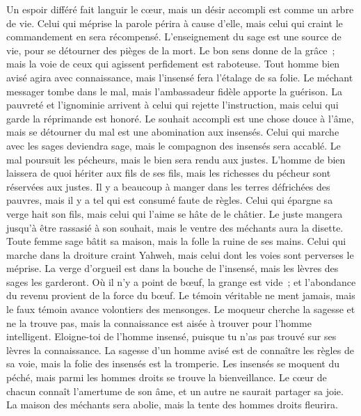 \begin{multicols}{2}
Un espoir différé fait languir le cœur, mais un désir accompli est comme un arbre de vie.
Celui qui méprise la parole périra à cause d'elle, mais celui qui craint le commandement en sera récompensé.
L'enseignement du sage est une source de vie, pour se détourner des pièges de la mort.
Le bon sens donne de la grâce~; mais la voie de ceux qui agissent perfidement est raboteuse.
Tout homme bien avisé agira avec connaissance, mais l'insensé fera l'étalage de sa folie.
Le méchant messager tombe dans le mal, mais l'ambassadeur fidèle apporte la guérison.
La pauvreté et l'ignominie arrivent à celui qui rejette l'instruction, mais celui qui garde la réprimande est honoré.
Le souhait accompli est une chose douce à l'âme, mais se détourner du mal est une abomination aux insensés.
Celui qui marche avec les sages deviendra sage, mais le compagnon des insensés sera accablé.
Le mal poursuit les pécheurs, mais le bien sera rendu aux justes.
L'homme de bien laissera de quoi hériter aux fils de ses fils, mais les richesses du pécheur sont réservées aux justes.
Il y a beaucoup à manger dans les terres défrichées des pauvres, mais il y a tel qui est consumé faute de règles.
Celui qui épargne sa verge hait son fils, mais celui qui l'aime se hâte de le châtier.
Le juste mangera jusqu'à être rassasié à son souhait, mais le ventre des méchants aura la disette.
\VerseOne{}Toute femme sage bâtit sa maison, mais la folle la ruine de ses mains.
Celui qui marche dans la droiture craint Yahweh, mais celui dont les voies sont perverses le méprise.
La verge d'orgueil est dans la bouche de l'insensé, mais les lèvres des sages les garderont.
Où il n'y a point de bœuf, la grange est vide~; et l'abondance du revenu provient de la force du bœuf.
Le témoin véritable ne ment jamais, mais le faux témoin avance volontiers des mensonges.
Le moqueur cherche la sagesse et ne la trouve pas, mais la connaissance est aisée à trouver pour l'homme intelligent.
Eloigne-toi de l'homme insensé, puisque tu n'as pas trouvé sur ses lèvres la connaissance.
La sagesse d'un homme avisé est de connaître les règles de sa voie, mais la folie des insensés est la tromperie.
Les insensés se moquent du péché, mais parmi les hommes droits se trouve la bienveillance.
Le cœur de chacun connaît l'amertume de son âme, et un autre ne saurait partager sa joie.
La maison des méchants sera abolie, mais la tente des hommes droits fleurira.

\end{multicols}
